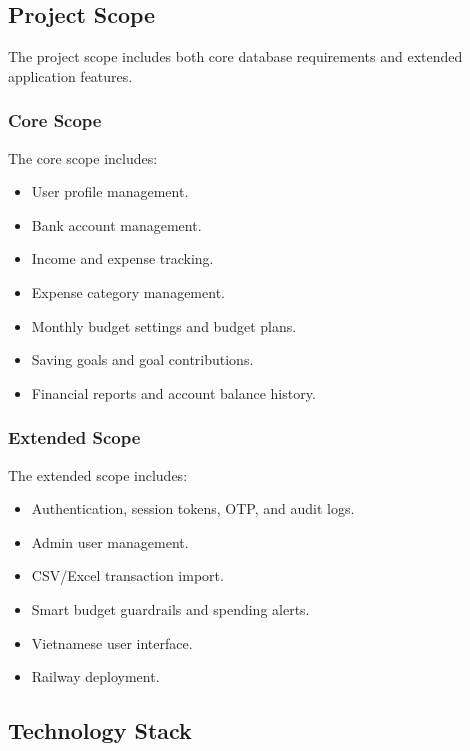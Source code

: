 \documentclass{article}
\begin{document}
\subsection{Project Scope}
The project scope includes both core database requirements and extended application features.

\subsubsection{Core Scope}
The core scope includes:
\begin{itemize}
    \item User profile management.
    \item Bank account management.
    \item Income and expense tracking.
    \item Expense category management.
    \item Monthly budget settings and budget plans.
    \item Saving goals and goal contributions.
    \item Financial reports and account balance history.
\end{itemize}

\subsubsection{Extended Scope}
The extended scope includes:
\begin{itemize}
    \item Authentication, session tokens, OTP, and audit logs.
    \item Admin user management.
    \item CSV/Excel transaction import.
    \item Smart budget guardrails and spending alerts.
    \item Vietnamese user interface.
    \item Railway deployment.
\end{itemize}

\subsection{Technology Stack}

\small
\renewcommand{\arraystretch}{1.15}
\end{document}
